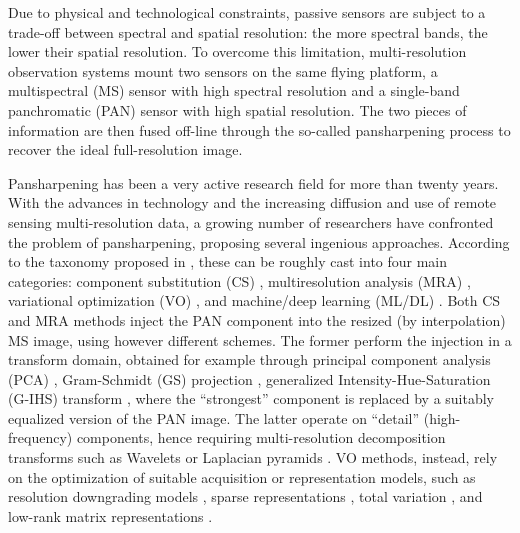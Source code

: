 \documentclass[journal]{IEEEtran}
\begin{document}
Due to physical and technological constraints,
passive sensors are subject to a trade-off between spectral and spatial resolution: the more spectral bands, the lower their spatial resolution.
To overcome this limitation,
multi-resolution observation systems mount two sensors on the same flying platform,
a multispectral (MS) sensor with high spectral resolution and a single-band panchromatic (PAN) sensor with high spatial resolution.
The two pieces of information are then fused off-line through the so-called pansharpening process \cite{Vivone2015}
to recover the ideal full-resolution image.

Pansharpening has been a very active research field for more than twenty years.
With the advances in technology and the increasing diffusion and use of remote sensing multi-resolution data,
a growing number of researchers have confronted the problem of pansharpening, proposing several ingenious approaches.
According to the taxonomy proposed in \cite{Vivone2020}, these can be roughly cast into four main categories:
component substitution (CS) \cite{Shettigara1992, Laben2000, Aiazzi2007, Garzelli2008, Choi2011, Garzelli2015, Vivone2019},
multiresolution analysis (MRA) \cite{Ranchin2000, Aiazzi2002, Otazu2005, Alparone2017, Lolli2017, Vivone2018, Vivone2018a},
variational optimization (VO) \cite{Vivone2015a, Vicinanza2015, Palsson2014}, and
machine/deep learning (ML/DL) \cite{Masi2016, Yang2017, Wei2017L, Masi2017, Yuan2018, Zhan2019, He2019, Vitale2018, Deng2020}.
Both CS and MRA methods inject the PAN component into the resized (by interpolation) MS image, using however different schemes.
The former perform the injection in a transform domain,
obtained for example through principal component analysis (PCA) \cite{Chavez1989}, Gram-Schmidt (GS) projection \cite{Laben2000}, generalized Intensity-Hue-Saturation (G-IHS) transform \cite{Tu2004},
where the ``strongest'' component is replaced by a suitably equalized version of the PAN image.
The latter operate on ``detail'' (high-frequency) components,
hence requiring multi-resolution decomposition transforms such as Wavelets \cite{Nunez1999, Ranchin2000, Otazu2005, Khan2008} or Laplacian pyramids \cite{Aiazzi2002, Aiazzi2003, Aiazzi2006, Lee2010, Restaino2017}.
VO methods, instead, rely on the optimization of suitable acquisition or representation models,
such as resolution downgrading models \cite{Vivone2015a}, sparse representations \cite{Vicinanza2015}, total variation \cite{Palsson2014}, and low-rank matrix representations \cite{Palsson2020}.
\end{document}
